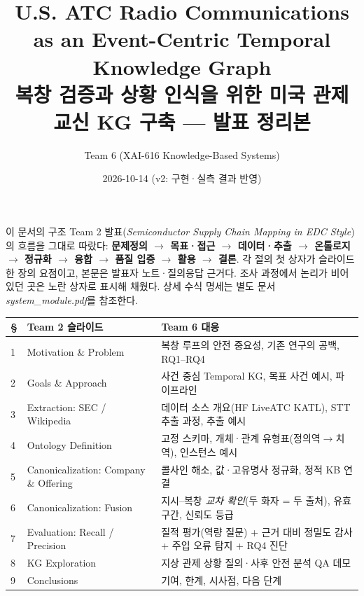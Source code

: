 \documentclass[10pt,a4paper]{article}
\title{\textbf{U.S. ATC Radio Communications as an Event-Centric Temporal Knowledge Graph}\\[3pt]
\large 복창 검증과 상황 인식을 위한 미국 관제 교신 KG 구축 --- 발표 정리본}
\author{Team 6 \quad (XAI-616 Knowledge-Based Systems)}
\date{2026-10-14 \quad (v2: 구현·실측 결과 반영)}
\begin{document}
\maketitle

\begin{keybox}{이 문서의 구조}
Team 2 발표(\emph{Semiconductor Supply Chain Mapping in EDC Style})의 흐름을 그대로 따랐다:
\textbf{문제정의 $\to$ 목표·접근 $\to$ 데이터·추출 $\to$ 온톨로지 $\to$ 정규화 $\to$ 융합 $\to$ 품질 입증 $\to$ 활용 $\to$ 결론}.
각 절의 첫 상자가 슬라이드 한 장의 요점이고, 본문은 발표자 노트·질의응답 근거다.
조사 과정에서 논리가 비어 있던 곳은 \colorbox{yellow!20}{노란 상자}로 표시해 채웠다. 상세 수식 명세는 별도 문서 \emph{system\_module.pdf}를 참조한다.
\end{keybox}

\begin{center}\small
\begin{tabularx}{\textwidth}{@{}l>{\raggedright\arraybackslash}X>{\raggedright\arraybackslash}X@{}}
\toprule
\S & Team 2 슬라이드 & Team 6 대응\\\midrule
1 & Motivation \& Problem & 복창 루프의 안전 중요성, 기존 연구의 공백, RQ1--RQ4\\
2 & Goals \& Approach & 사건 중심 Temporal KG, 목표 사건 예시, 파이프라인\\
3 & Extraction: SEC / Wikipedia & 데이터 소스 개요(HF LiveATC KATL), STT 추출 과정, 추출 예시\\
4 & Ontology Definition & 고정 스키마, 개체·관계 유형표(정의역$\to$치역), 인스턴스 예시\\
5 & Canonicalization: Company \& Offering & 콜사인 해소, 값·고유명사 정규화, 정적 KB 연결\\
6 & Canonicalization: Fusion & 지시--복창 \emph{교차 확인}(두 화자 = 두 출처), 유효 구간, 신뢰도 등급\\
7 & Evaluation: Recall / Precision & 질적 평가(역량 질문) + 근거 대비 정밀도 감사 + 주입 오류 탐지 + RQ4 진단\\
8 & KG Exploration & 지상 관제 상황 질의·사후 안전 분석 QA 데모\\
9 & Conclusions & 기여, 한계, 시사점, 다음 단계\\
\bottomrule
\end{tabularx}
\end{center}

\end{document}

